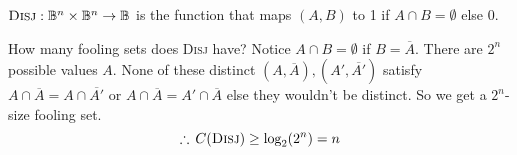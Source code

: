 \begin{example}
$\textsc{Disj} : \mathbb{B}^n \times \mathbb{B}^n \to \mathbb{B}$ is the function
that maps $(A, B)$ to 1 if $A \cap B = \emptyset$ else 0.
\end{example}

How many fooling sets does \textsc{Disj} have?
\pause
Notice $A \cap B = \emptyset$ if $B = \overline{A}$.
\pause
There are $2^n$ possible values $A$.
\pause
None of these distinct $(A, \overline{A}), (A', \overline{A'})$ satisfy
 $A \cap \overline{A} = A \cap \overline{A'}$ or
$A \cap \overline{A} = A' \cap \overline{A}$
else they wouldn't be distinct.
\pause
So we get a $2^n$-size fooling set.
\pause
\[\therefore \, C(\textsc{Disj}) \geq \text{log}_2(2^n) = n\]